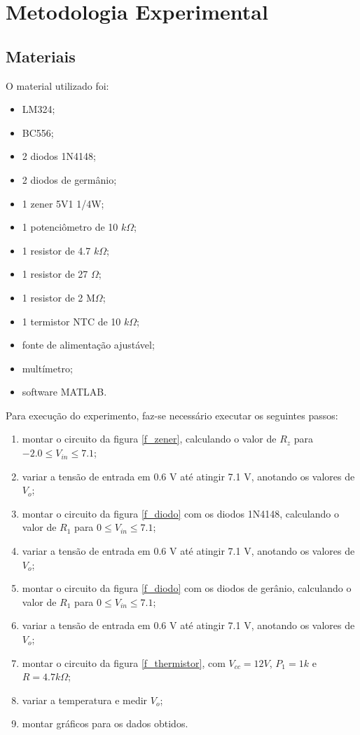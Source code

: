 \newpage
\section{Metodologia Experimental}

\subsection{Materiais}
O material utilizado foi:
\begin{itemize}
\item LM324;
\item BC556;
\item 2 diodos 1N4148;
\item 2 diodos de germânio;
\item 1 zener 5V1 1/4W;
\item 1 potenciômetro de 10 $k\Omega$;
\item 1 resistor de 4.7 $k\Omega$;
\item 1 resistor de 27 $\Omega$;
\item 1 resistor de 2 M$\Omega$;
\item 1 termistor NTC de 10 $k\Omega$;
\item fonte de alimentação ajustável;
\item multímetro;
\item software MATLAB.
\end{itemize}

Para execução do experimento, faz-se necessário executar os seguintes passos:

\begin{enumerate}
\item montar o circuito da figura \ref{f_zener}, calculando o valor de $R_z$ para $-2.0 \le V_{in} \le 7.1$;
\item variar a tensão de entrada em 0.6 V até atingir 7.1 V, anotando os valores de $V_o$;
\item montar o circuito da figura \ref{f_diodo} com os diodos 1N4148, calculando o valor de $R_1$ para $0 \le V_{in} \le 7.1$;
\item variar a tensão de entrada em 0.6 V até atingir 7.1 V, anotando os valores de $V_o$;
\item montar o circuito da figura \ref{f_diodo} com os diodos de gerânio, calculando o valor de $R_1$ para $0 \le V_{in} \le 7.1$;
\item variar a tensão de entrada em 0.6 V até atingir 7.1 V, anotando os valores de $V_o$;
\item montar o circuito da figura \ref{f_thermistor}, com $V_{cc} = 12V$, $P_1 = 1k$ e $R = 4.7 k\Omega$;
\item variar a temperatura e medir $V_o$;
\item montar gráficos para os dados obtidos.
\end{enumerate}
